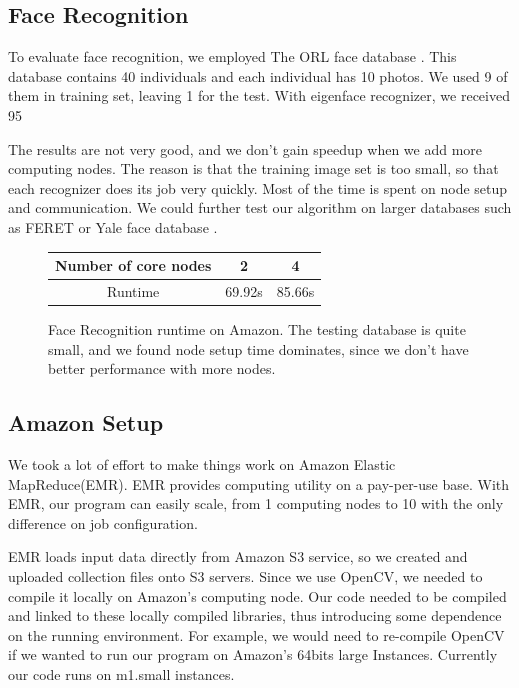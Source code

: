 \documentclass[11pt, draftclsnofoot, onecolumn]{IEEEtran}
\begin{document}
\subsection{Face Recognition}
To evaluate face recognition, we employed The ORL face database \cite{ORLdatabase}. This database contains 40 individuals and each individual has 10 photos. We used 9 of them in training set, leaving 1 for the test. With eigenface recognizer, we received 95%

The results are not very good, and we don’t gain speedup when we add more computing nodes. The reason is that the training image set is too small, so that each recognizer does its job very quickly. Most of the time is spent on node setup and communication.  We could further test our algorithm on larger databases such as FERET \cite{phillips2000feret} or Yale face database \cite{georghiades1997yale}.

\begin{figure} \label{tab:face_recog}
 \centering
 \begin{tabular} {|c|c|c|}
  \hline
  Number of core nodes & 2 & 4 \\ \hline
  Runtime & 69.92s & 85.66s \\ \hline
 \end{tabular}
 
 \caption{Face Recognition runtime on Amazon. The testing database is quite small, and we found node setup time dominates, since we don't have better performance with more nodes.}
\end{figure}

\subsection{Amazon Setup}
We took a lot of effort to make things work on Amazon Elastic MapReduce(EMR). EMR provides computing utility on a pay-per-use base. With EMR, our program can easily scale, from 1 computing nodes to 10 with the only difference on job configuration. 

EMR loads input data directly from Amazon S3 service, so we created and uploaded collection files onto S3 servers. Since we use OpenCV, we needed to compile it locally on Amazon’s computing node. Our code needed to be compiled and linked to these locally compiled libraries, thus introducing some dependence on the running environment. For example, we would need to re-compile OpenCV if we wanted to run our program on Amazon’s 64bits large Instances. Currently our code runs on m1.small instances. 
\end{document}
